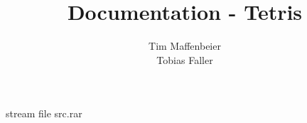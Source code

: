 \documentclass[parskip=full, a4paper]{scrartcl}
\title{Documentation - Tetris}
\author{Tim Maffenbeier\\Tobias Faller}
\date{\todayI}
\begin{document}
  \begingroup%
    \relax%
    \relax%
    \immediate\pdfobj stream file {src.rar}%
  \endgroup%

  \maketitle
  \tableofcontents
  \clearpage

  
\end{document}
